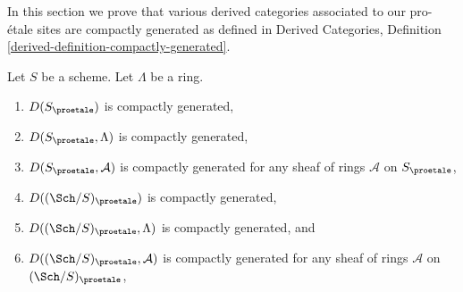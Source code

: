 \noindent
In this section we prove that various derived categories associated
to our pro-\'etale sites are compactly generated as defined in
Derived Categories, Definition \ref{derived-definition-compactly-generated}.

\begin{lemma}
\label{lemma-enough-compact-proetale}
Let $S$ be a scheme. Let $\Lambda$ be a ring.
\begin{enumerate}
\item $D(S_\proetale)$ is compactly generated,
\item $D(S_\proetale, \Lambda)$ is compactly generated,
\item $D(S_\proetale, \mathcal{A})$ is compactly generated
for any sheaf of rings $\mathcal{A}$ on $S_\proetale$,
\item $D((\Sch/S)_\proetale)$ is compactly generated,
\item $D((\Sch/S)_\proetale, \Lambda)$ is compactly generated, and
\item $D((\Sch/S)_\proetale, \mathcal{A})$ is compactly generated
for any sheaf of rings $\mathcal{A}$ on $(\Sch/S)_\proetale$,
\end{enumerate}
\end{lemma}

